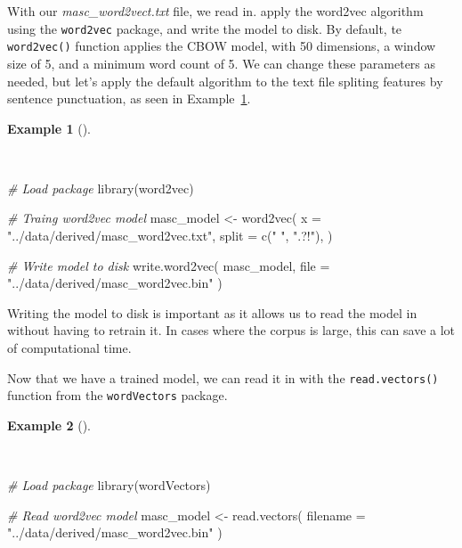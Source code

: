 \documentclass[
  letterpaper,
  DIV=11,
  numbers=noendperiod]{scrreport}
\newenvironment{Shaded}{\begin{snugshade}}{\end{snugshade}}
\newcommand{\AttributeTok}[1]{\textcolor[rgb]{0.00,0.00,0.00}{#1}}
\newcommand{\CommentTok}[1]{\textcolor[rgb]{0.00,0.00,0.00}{\textit{#1}}}
\newcommand{\FunctionTok}[1]{\textcolor[rgb]{0.00,0.00,0.00}{#1}}
\newcommand{\NormalTok}[1]{\textcolor[rgb]{0.00,0.00,0.00}{#1}}
\newcommand{\OtherTok}[1]{\textcolor[rgb]{0.00,0.00,0.00}{#1}}
\newcommand{\StringTok}[1]{\textcolor[rgb]{0.00,0.00,0.00}{#1}}
\theoremstyle{definition}
\newtheorem{example}{Example}[chapter]
\theoremstyle{remark}
\begin{document}
With our \emph{masc\_word2vect.txt} file, we read in. apply the word2vec
algorithm using the \texttt{word2vec} package, and write the model to
disk. By default, te \texttt{word2vec()} function applies the CBOW
model, with 50 dimensions, a window size of 5, and a minimum word count
of 5. We can change these parameters as needed, but let's apply the
default algorithm to the text file spliting features by sentence
punctuation, as seen in Example~\ref{exm-eda-masc-vsm-word2vec-train}.

\begin{example}[]\protect\hypertarget{exm-eda-masc-vsm-word2vec-train}{}\label{exm-eda-masc-vsm-word2vec-train}

~

\begin{Shaded}
\begin{Highlighting}[]
\CommentTok{\# Load package}
\FunctionTok{library}\NormalTok{(word2vec)}

\CommentTok{\# Traing word2vec model}
\NormalTok{masc\_model }\OtherTok{\textless{}{-}} 
  \FunctionTok{word2vec}\NormalTok{(}
    \AttributeTok{x =} \StringTok{"../data/derived/masc\_word2vec.txt"}\NormalTok{,}
    \AttributeTok{split =} \FunctionTok{c}\NormalTok{(}\StringTok{" "}\NormalTok{, }\StringTok{".?!"}\NormalTok{),}
\NormalTok{  )}

\CommentTok{\# Write model to disk}
\FunctionTok{write.word2vec}\NormalTok{(}
\NormalTok{  masc\_model,}
  \AttributeTok{file =} \StringTok{"../data/derived/masc\_word2vec.bin"}
\NormalTok{)}
\end{Highlighting}
\end{Shaded}

\end{example}

Writing the model to disk is important as it allows us to read the model
in without having to retrain it. In cases where the corpus is large,
this can save a lot of computational time.

Now that we have a trained model, we can read it in with the
\texttt{read.vectors()} function from the \texttt{wordVectors} package.

\begin{example}[]\protect\hypertarget{exm-eda-masc-vsm-word2vec-read}{}\label{exm-eda-masc-vsm-word2vec-read}

~

\begin{Shaded}
\begin{Highlighting}[]
\CommentTok{\# Load package}
\FunctionTok{library}\NormalTok{(wordVectors)}

\CommentTok{\# Read word2vec model}
\NormalTok{masc\_model }\OtherTok{\textless{}{-}} 
  \FunctionTok{read.vectors}\NormalTok{(}
    \AttributeTok{filename =} \StringTok{"../data/derived/masc\_word2vec.bin"}
\NormalTok{  )}
\end{Highlighting}
\end{Shaded}

\end{example}
\end{document}
